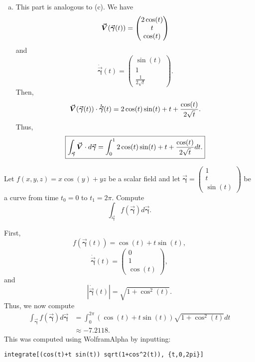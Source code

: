 \documentclass[12pt]{article} %
\newcommand{\curvegamma}{\boldsymbol{\vec{\gamma}}}
\newcommand{\tangentgamma}{\boldsymbol{\dot{\vec{\gamma}}}}
\begin{document}
\begin{solution}
\begin{enumerate}[(a)]
    \item This part is analogous to (c). We have
    \[
    \vecfieldV(\curvegamma(t)) = \begin{pmatrix} 2 \cos(t) \\ t \\ \cos(t) \end{pmatrix}
    \]
    and
    \[
    \tangentgamma(t) = \begin{pmatrix} \sin(t) \\ 1 \\ \frac{1}{2\sqrt{t}} \end{pmatrix}.
    \]
    Then,
    \[
    \vecfieldV(\curvegamma(t)) \cdot \tangentgamma(t) = 2 \cos(t) \sin(t) + t + \frac{\cos(t)}{2\sqrt{t}}.
    \]
    Thus,
    \[
    \boxed{\int_{\curvegamma} \vecfieldV \cdot d\curvegamma = \int_0^1 2 \cos(t) \sin(t) + t + \frac{\cos(t)}{2\sqrt{t}} dt.}
    \]
\end{enumerate}
\end{solution}

\newpage
\begin{problem}
Let $f(x,y,z)=x \cos(y) + yz$ be a scalar field and let $\curvegamma = \begin{pmatrix} 1 \\ t \\ \sin(t) \end{pmatrix}$ be a curve from time $t_0 = 0$ to $t_1 = 2 \pi$. Compute
\[
    \int_{\curvegamma} f(\curvegamma)d\curvegamma.
\]
\end{problem}
\begin{solution}
First,
\[
f(\curvegamma(t)) = \cos(t) + t \sin(t),
\]
\[
\tangentgamma(t) = \begin{pmatrix} 0 \\ 1 \\ \cos(t) \end{pmatrix},
\]
and
\[
\left| \tangentgamma(t) \right| = \sqrt{1+\cos^2(t)}.
\]
Thus, we now compute
\begin{align*}
    \int_{\curvegamma} f(\curvegamma)d\curvegamma & = \int_0^{2\pi} (\cos(t) + t \sin(t)) \sqrt{1+\cos^2(t)} dt\\
    &\approx -7.2118.
\end{align*}
This was computed using WolframAlpha by inputting:
\begin{verbatim}
integrate[(cos(t)+t sin(t)) sqrt(1+cos^2(t)), {t,0,2pi}]
\end{verbatim}
\end{solution}
\end{document}

